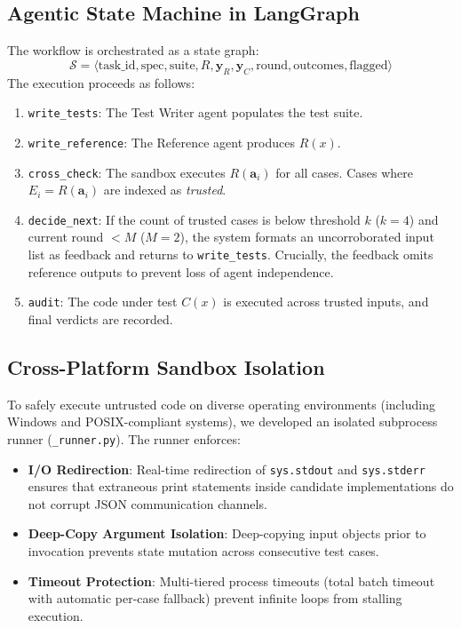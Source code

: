 \documentclass[conference]{IEEEtran}
\begin{document}
\subsection{Agentic State Machine in LangGraph}
The workflow is orchestrated as a state graph:
\begin{equation}
\mathcal{S} = \langle \text{task\_id}, \text{spec}, \text{suite}, R, \mathbf{y}_R, \mathbf{y}_C, \text{round}, \text{outcomes}, \text{flagged} \rangle
\end{equation}
The execution proceeds as follows:
\begin{enumerate}
    \item \texttt{write\_tests}: The Test Writer agent populates the test suite.
    \item \texttt{write\_reference}: The Reference agent produces $R(x)$.
    \item \texttt{cross\_check}: The sandbox executes $R(\mathbf{a}_i)$ for all cases. Cases where $E_i = R(\mathbf{a}_i)$ are indexed as \textit{trusted}.
    \item \texttt{decide\_next}: If the count of trusted cases is below threshold $k$ ($k=4$) and current round $< M$ ($M=2$), the system formats an uncorroborated input list as feedback and returns to \texttt{write\_tests}. Crucially, the feedback omits reference outputs to prevent loss of agent independence.
    \item \texttt{audit}: The code under test $C(x)$ is executed across trusted inputs, and final verdicts are recorded.
\end{enumerate}

\subsection{Cross-Platform Sandbox Isolation}
To safely execute untrusted code on diverse operating environments (including Windows and POSIX-compliant systems), we developed an isolated subprocess runner (\texttt{\_runner.py}). The runner enforces:
\begin{itemize}
    \item \textbf{I/O Redirection}: Real-time redirection of \texttt{sys.stdout} and \texttt{sys.stderr} ensures that extraneous print statements inside candidate implementations do not corrupt JSON communication channels.
    \item \textbf{Deep-Copy Argument Isolation}: Deep-copying input objects prior to invocation prevents state mutation across consecutive test cases.
    \item \textbf{Timeout Protection}: Multi-tiered process timeouts (total batch timeout with automatic per-case fallback) prevent infinite loops from stalling execution.
\end{itemize}
\end{document}
